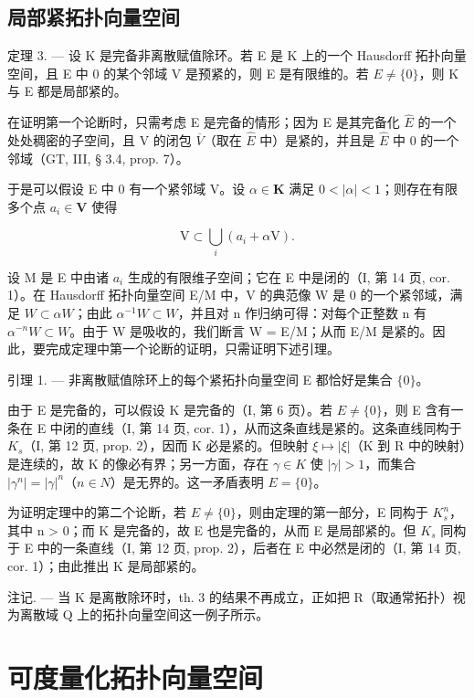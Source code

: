 \subsection{局部紧拓扑向量空间}

定理 3. --- 设 K 是完备非离散赋值除环。若 E 是 K 上的一个 Hausdorff 拓扑向量空间，且 E 中 0 的某个邻域 V 是预紧的，则 E 是有限维的。若 \(E \neq \{0\}\)，则 K 与 E 都是局部紧的。

在证明第一个论断时，只需考虑 E 是完备的情形；因为 E 是其完备化 \(\hat{E}\) 的一个处处稠密的子空间，且 V 的闭包 \(\overline{V}\)（取在 \(\hat{E}\) 中）是紧的，并且是 \(\hat{E}\) 中 0 的一个邻域（GT, III, § 3.4, prop. 7）。

于是可以假设 E 中 0 有一个紧邻域 V。设 \(\alpha \in \mathbf{K}\) 满足 \(0 < |\alpha| < 1\)；则存在有限多个点 \(a_i \in \mathbf{V}\) 使得

\[
\mathrm{V} \subset \bigcup_ {i} (a _ {i} + \alpha \mathrm{V}).
\]

设 M 是 E 中由诸 \(a_{i}\) 生成的有限维子空间；它在 E 中是闭的（I, 第 14 页, cor. 1）。在 Hausdorff 拓扑向量空间 E/M 中，V 的典范像 W 是 0 的一个紧邻域，满足 \(W \subset \alpha W\)；由此 \(\alpha^{-1} W \subset W\)，并且对 n 作归纳可得：对每个正整数 n 有 \(\alpha^{-n} W \subset W\)。由于 W 是吸收的，我们断言 W = E/M；从而 E/M 是紧的。因此，要完成定理中第一个论断的证明，只需证明下述引理。

引理 1. --- 非离散赋值除环上的每个紧拓扑向量空间 E 都恰好是集合 \(\{0\}\)。

由于 E 是完备的，可以假设 K 是完备的（I, 第 6 页）。若 \(E \neq \{0\}\)，则 E 含有一条在 E 中闭的直线（I, 第 14 页, cor. 1），从而这条直线是紧的。这条直线同构于 \(K_{s}\)（I, 第 12 页, prop. 2），因而 K 必是紧的。但映射 \(\xi \mapsto |\xi|\)（K 到 R 中的映射）是连续的，故 K 的像必有界；另一方面，存在 \(\gamma \in K\) 使 \(|\gamma| > 1\)，而集合 \(|\gamma^{n}| = |\gamma|^{n}\)（\(n \in N\)）是无界的。这一矛盾表明 \(E = \{0\}\)。

为证明定理中的第二个论断，若 \(E \neq \{0\}\)，则由定理的第一部分，E 同构于 \(K_{s}^{n}\)，其中 n \textgreater{} 0；而 K 是完备的，故 E 也是完备的，从而 E 是局部紧的。但 \(K_{s}\) 同构于 E 中的一条直线（I, 第 12 页, prop. 2），后者在 E 中必然是闭的（I, 第 14 页, cor. 1）；由此推出 K 是局部紧的。

注记. --- 当 K 是离散除环时，th. 3 的结果不再成立，正如把 R（取通常拓扑）视为离散域 Q 上的拓扑向量空间这一例子所示。

\section{可度量化拓扑向量空间}

